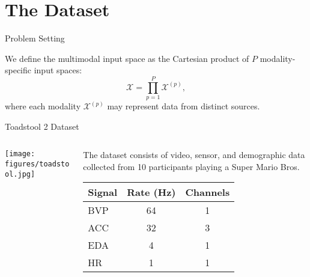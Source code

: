 \section{The Dataset}

\begin{frame}{Problem Setting}
	\begin{block}{}
		We define the multimodal input space as the Cartesian product of $P$ modality-specific input spaces:
		\[
		\mathcal{X} = \prod_{p=1}^{P} \mathcal{X}^{(p)},
		\]
		where each modality $\mathcal{X}^{(p)}$ may represent data from distinct sources.
	\end{block}
	
\end{frame}



\begin{frame}{Toadstool 2 Dataset}
		\begin{columns}[T] %
		\begin{column}{0.4\textwidth}
			\texttt{[image: figures/toadstool.jpg]}
			
		\end{column}
		\begin{column}{0.6\textwidth}
			\begin{block}{}
				The dataset consists of video, sensor, and demographic data collected from 10 participants playing a Super Mario Bros.
			\end{block}

		\centering
		\small
		\begin{tabular}{lcc}
		\toprule
		\textbf{Signal} & \textbf{Rate (Hz)} & \textbf{Channels} \\
		\midrule
		BVP  & 64 & 1      \\
		ACC  & 32 & 3 		\\
		EDA  & 4  & 1      \\
		HR   & 1  & 1      \\
		\bottomrule
		\end{tabular}
		
		\begin{figure}[htbp]
			\centering
		\end{figure}


		\end{column}
	\end{columns}
\end{frame}


